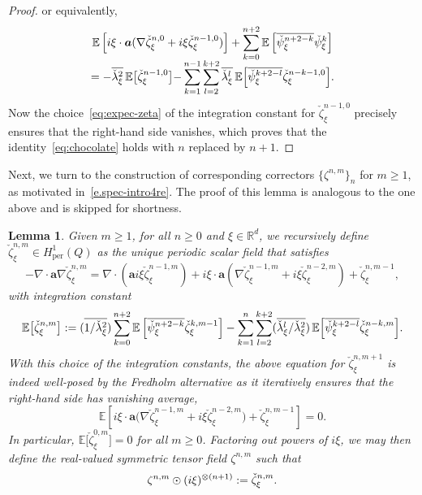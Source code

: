 \documentclass[10pt]{amsart}
\theoremstyle{plain}
\newtheorem{lem0}[theor0]{Lemma}
\newenvironment{lem}
{\renewcommand{\qedsymbol}{$\lozenge$}\pushQED{\qed}\begin{lem0}}
{\popQED\end{lem0}}
\theoremstyle{definition}
\numberwithin{equation}{section}
\newcommand{\R}{\mathbb R}
\newcommand{\per}{{\operatorname{per}}}
\newcommand{\Aa}{\boldsymbol a}
\newcommand{\expec}[1]{\mathbb{E}\left[ #1 \right]}
\newcommand{\Bexpec}[1]{\mathbb{E}\Bigl[ #1 \Bigr]}
\newcommand{\expecm}[1]{\mathbb{E}\bigl[ #1 \bigr]}\let\bexpec\expecm
\begin{document}
\begin{proof}
or equivalently,\vspace*{-3pt}
\begin{multline*}
\expec{i\xi \cdot \Aa(\nabla \check\zeta_\xi^{n,0}+i\xi\check\zeta_\xi^{n-1,0})}+\sum_{k=0}^{n+2}\expec{\overline{\check \psi_\xi^{n+2-k}}\check\psi_\xi^{k}}\\[-5pt]
={-}\overline{\check \lambda_\xi^2}\,\expecm{\check\zeta_\xi^{n-1,0}}
{-}\sum_{k=1}^{n-1}\sum_{l=2}^{k+2}\overline{\check \lambda_\xi^l}\,\Bexpec{ \overline{\check \psi_\xi^{k+2-l}}\check\zeta_\xi^{n-k-1,0}}.
\end{multline*}
Now the choice~\eqref{eq:expec-zeta} of the integration constant for $\check\zeta_\xi^{n-1,0}$ precisely ensures that the right-hand side vanishes, which proves that the identity~\eqref{eq:chocolate} holds with $n$ replaced by $n+1$.
\end{proof}

Next, we turn to the construction of corresponding correctors $\{\zeta^{n,m}\}_{n}$ for $m\ge1$, as motivated in~\eqref{e.spec-intro4re}. The proof of this lemma is analogous to the one above and is skipped for shortness.

\begin{lem}\label{lem:spec-corr-zeta-2}
Given $m\ge1$, for all $n\ge0$ and $\xi\in\R^d$, we recursively define $\check\zeta^{n,m}_\xi\in H^1_{{\per}}(Q)$ as the unique periodic scalar field that satisfies\vspace*{-3pt}
\begin{equation}\label{e.zetajn}
-\nabla\cdot\Aa\nabla\check\zeta^{n,m}_\xi=
\nabla\cdot(\Aa i\xi\check\zeta^{n-1,m}_\xi)+
i\xi\cdot\Aa(\nabla\check\zeta^{n-1,m}_\xi+i\xi\check\zeta^{n-2,m}_\xi)+\check\zeta^{n,m-1}_\xi,
\end{equation}
with integration constant\vspace*{-4pt}\enlargethispage{.3\baselineskip}
\[\expecm{\check\zeta^{n,m}_\xi}:=(\overline{1/\check\lambda_\xi^2})\sum_{k=0}^{n+2}\expec{\overline{\check\psi^{n+2-k}_\xi}\check\zeta^{k,m-1}_\xi}-\sum_{k=1}^{n}\sum_{l=2}^{k+2}(\overline{\check\lambda_\xi^l/\check\lambda_\xi^2})\,\Bexpec{\overline{\check\psi^{k+2-l}_\xi}\check\zeta^{n-k,m}_\xi}.\]
With this choice of the integration constants, the above equation for $\check\zeta^{n,m+1}_\xi$ is indeed well-posed by the Fredholm alternative as it iteratively ensures that the right-hand side has vanishing average,\vspace*{-3pt}
\begin{equation}\label{eq:chocolate-2}
\expec{i\xi\cdot\Aa\big(\nabla\check\zeta^{n-1,m}_\xi+i\xi\check\zeta^{n-2,m}_\xi\big)+\check\zeta^{n,m-1}_\xi}=0.
\end{equation}
In particular, $\expecm{\check\zeta_\xi^{0,m}}=0$ for all $m\ge0$.
{Factoring out powers of $i\xi$,} we may then define the real-valued symmetric tensor field $\zeta^{n,m}$ such that\vspace*{-3pt}
\[\zeta^{n,m} \odot (i\xi)^{\otimes (n+1)}:=\check\zeta^{n,m}_{\xi}.\qedhere\]
\end{lem}
\end{document}
